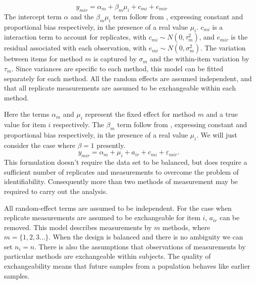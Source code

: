 \documentclass[12pt, a4paper]{report}
\theoremstyle{plain}
\theoremstyle{definition}
\theoremstyle{remark}
\begin{document}
\begin{equation}
	y_{mir}  = \alpha_{m} + \beta_{m}\mu_{i} + c_{mi} + e_{mir} \qquad
\end{equation}
The intercept term $\alpha$ and the $\beta_{m}\mu_{i}$ term follow from \citet{DunnSEME}, expressing constant and proportional bias respectively, in the presence of a real value $\mu_{i}$. $c_{mi}$ is a interaction term to account for replicates, with $c_{mi} \sim N(0,\tau^{2}_{m})$, and $e_{mir}$ is the residual associated with each observation, with $ e_{mi} \sim N(0,\sigma^{2}_{m})$. 
The variation between items for method $m$ is captured by $\sigma_m$ and the within-item variation by $\tau_m$. Since variances are specific to each method, this model can be fitted separately for each method. All the random effects are assumed independent, and that all replicate measurements are assumed to be exchangeable within each method. 

Here the terms $\alpha_{m}$ and $\mu_{i}$ represent the fixed effect for method $m$ and a true value for item $i$ respectively. The $\beta_{m}$ term follow from \citet{DunnSEME}, expressing constant and proportional bias respectively, in the presence of a real value $\mu_{i}.$ We will just consider the case where $\beta=1$ presently. 
\begin{equation}\label{BXC-model}
y_{mir}  = \alpha_{m} + \mu_{i} + a_{ir} + c_{mi} + \varepsilon_{mir}.
\end{equation}
This formulation doesn't require the data set to be balanced, but does require a sufficient number of replicates and measurements to overcome the problem of identifiability. Consequently more than two methods of measurement may
be required to carry out the analysis. 

All random-effect terms are assumed to be independent. For the case when replicate measurements are assumed to be exchangeable for item $i$, $a_{ir}$ can be removed. This model describes measurements by $m$ methods, where $m = \{1,2,3\ldots\}$. When the design is balanced and there is no ambiguity we can set $n_i=n$. There is also the assumptions that observations of measurements by particular methods are exchangeable within subjects. The quality of exchangeability means that future samples from a population behaves like earlier samples. 


	
	
\end{document}

